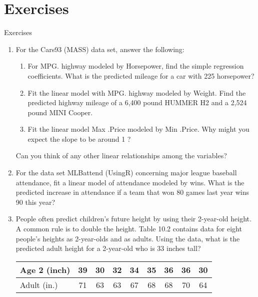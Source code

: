 \section{Exercises}

\begin{frame}[allowframebreaks]{Exercises}
  \begin{enumerate}
  \item  For the Cars93 (MASS) data set, answer the following:
    \begin{enumerate}
    \item For MPG. highway modeled by Horsepower, find the simple regression
coefficients. What is the predicted mileage for a car with 225 horsepower?
    \item Fit the linear model with MPG. highway modeled by Weight. Find the predicted highway mileage of a 6,400 pound HUMMER H2 and a 2,524 pound MINI Cooper.
    \item Fit the linear model Max .Price modeled by Min .Price. Why might you expect the slope to be around 1 ?
    \end{enumerate}
    Can you think of any other linear relationships among the variables?
  \item  For the data set MLBattend (UsingR) concerning major league baseball
attendance, fit a linear model of attendance modeled by wins. What is the predicted increase in attendance if a team that won 80 games last year wins 90 this year?
  \item  People often predict children’s future height by using their 2-year-old height. A common rule is to double the height. Table 10.2 contains data for eight people’s heights as 2-year-olds and as adults. Using the data, what is the predicted adult height for a 2-year-old who is 33 inches tall?

    \begin{tabular}{l c c c c c c c c}
      \hline
      Age 2 (inch) & 39 & 30 & 32 & 34 & 35 & 36 & 36 & 30 \\
      \hline
      Adult (in.) & 71 & 63 & 63 & 67 & 68 & 68 & 70 & 64 \\
      \hline
    \end{tabular}
  \end{enumerate}
\end{frame}
